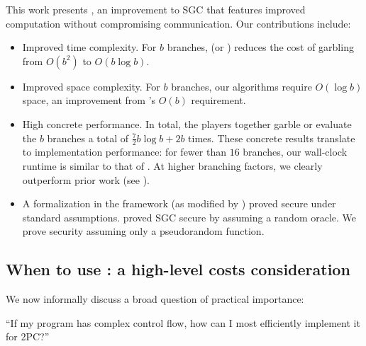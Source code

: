 \medskip
This work presents \ourschemelong, an improvement to SGC that features
improved computation without compromising communication.
Our contributions include:
\begin{itemize}
  \item Improved time complexity.
    For $b$ branches, \ourschemelong (or
    \ourscheme)  reduces the cost of garbling  from $O(b^2)$ to
    $O(b \log b)$.
  \item Improved space complexity.
    For $b$ branches, our algorithms require $O(\log b)$ space, an
    improvement from \HK's $O(b)$ requirement.
  \item High concrete performance.
    In total, the players together garble or evaluate the $b$ branches
    a total of $\frac{7}{2} b\log b + 2b$ times.
    These concrete results translate to implementation performance: for fewer
    than $16$ branches, our wall-clock runtime is similar to that
    of \HK. At higher branching factors, we clearly outperform prior
    work (see ).
  \item
    A formalization in the \cite{CCS:BelHoaRog12} framework (as
    modified by \HK) proved
    secure under standard assumptions.
    \HK proved SGC secure by assuming a random oracle.
    We prove security assuming only a pseudorandom function.
\end{itemize}



\subsection{When to use \ourschemelong: a high-level costs consideration}
\label{sec:whentouse}

We now informally discuss a broad question of
practical importance:

\begin{displayquote}
  ``If my program has complex control flow, how can I most efficiently implement it for 2PC?''
\end{displayquote}


